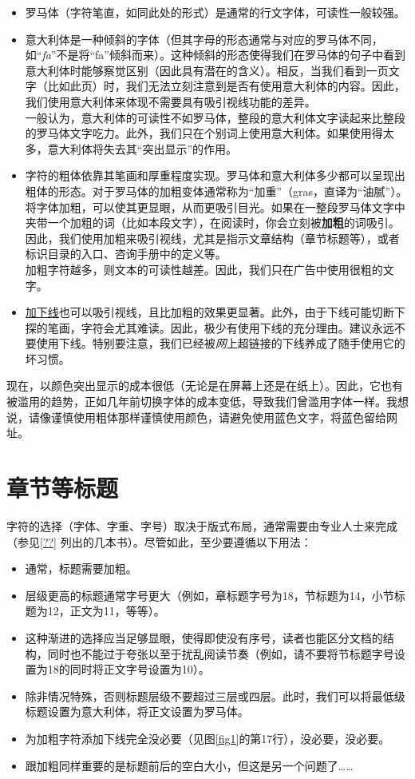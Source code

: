 \begin{itemize}
    \item 罗马体（字符笔直，如同此处的形式）是通常的行文字体，可读性一般较强。
    \item 意大利体是一种倾斜的字体（但其字母的形态通常与对应的罗马体不同，如``\emph{fa}''不是将``fa''倾斜而来）。这种倾斜的形态使得我们在罗马体的句子中看到意大利体时能够察觉区别（因此具有潜在的含义）。相反，当我们看到一页文字（比如此页）时，我们无法立刻注意到是否有使用意大利体的内容。因此，我们使用意大利体来体现不需要具有吸引视线功能的差异。\\
    一般认为，意大利体的可读性不如罗马体，整段的意大利体文字读起来比整段的罗马体文字吃力。此外，我们只在个别词上使用意大利体。如果使用得太多，意大利体将失去其``突出显示''的作用。
    \item 字符的粗体依靠其笔画和厚重程度实现。罗马体和意大利体多少都可以呈现出粗体的形态。对于罗马体的加粗变体通常称为``加重''（gras，直译为``油腻''）。将字体加粗，可以使其更显眼，从而更吸引目光。如果在一整段罗马体文字中夹带一个加粗的词（比如本段文字），在阅读时，你会立刻被\textbf{加粗}的词吸引。因此，我们使用加粗来吸引视线，尤其是指示文章结构（章节标题等），或者标识目录的入口、咨询手册中的定义等。\\
    加粗字符越多，则文本的可读性越差。因此，我们只在广告中使用很粗的文字。
    \item \underline{加下线}也可以吸引视线，且比加粗的效果更显著。此外，由于下线可能切断下探的笔画，字符会尤其难读。因此，极少有使用下线的充分理由。建议永远不要使用下线。特别要注意，我们已经被\emph{网}上超链接的下线养成了随手使用它的坏习惯。
\end{itemize}

现在，以颜色突出显示的成本很低（无论是在屏幕上还是在纸上）。因此，它也有被滥用的趋势，正如几年前切换字体的成本变低，导致我们曾滥用字体一样。我想说，请像谨慎使用粗体那样谨慎使用颜色，请避免使用蓝色文字，将蓝色留给网址。

\section{章节等标题}

字符的选择（字体、字重、字号）取决于版式布局，通常需要由专业人士来完成（参见\ref{??}%
列出的几本书）。尽管如此，至少要遵循以下用法：

\begin{itemize}
    \item 通常，标题需要加粗。
    \item 层级更高的标题通常字号更大（例如，章标题字号为18，节标题为14，小节标题为12，正文为11，等等）。
    \item 这种渐进的选择应当足够显眼，使得即使没有序号，读者也能区分文档的结构，同时也不能过于夸张以至于扰乱阅读节奏（例如，请不要将节标题字号设置为18的同时将正文字号设置为10）。
    \item 除非情况特殊，否则标题层级不要超过三层或四层。此时，我们可以将最低级标题设置为意大利体，将正文设置为罗马体。
    \item 为加粗字符添加下线完全没必要（见图\ref{fig1}的第17行），没必要，没必要。
    \item 跟加粗同样重要的是标题前后的空白大小，但这是另一个问题了……
\end{itemize}

